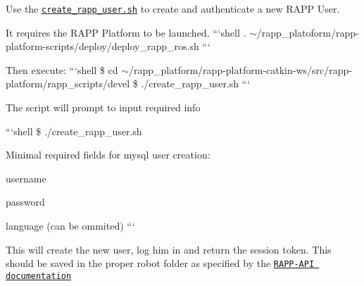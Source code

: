 Use the \href{https://github.com/rapp-project/rapp-platform-scripts/blob/master/utilities/create_rapp_user.sh}{\tt create\-\_\-rapp\-\_\-user.\-sh} to create and authenticate a new R\-A\-P\-P User.

It requires the R\-A\-P\-P Platform to be launched. ```shell . $\sim$/rapp\-\_\-platoform/rapp-\/platform-\/scripts/deploy/deploy\-\_\-rapp\-\_\-ros.sh ```

Then execute\-: ```shell \$ cd $\sim$/rapp\-\_\-platform/rapp-\/platform-\/catkin-\/ws/src/rapp-\/platform/rapp\-\_\-scripts/devel \$ ./create\-\_\-rapp\-\_\-user.sh ```

The script will prompt to input required info

```shell \$ ./create\-\_\-rapp\-\_\-user.sh

Minimal required fields for mysql user creation\-:
\begin{DoxyItemize}
\item username
\item password
\item language (can be ommited) ```
\end{DoxyItemize}

This will create the new user, log him in and return the session token. This should be saved in the proper robot folder as specified by the \href{https://github.com/rapp-project/rapp-api/tree/python/python#authenticationtokens}{\tt R\-A\-P\-P-\/\-A\-P\-I documentation} 